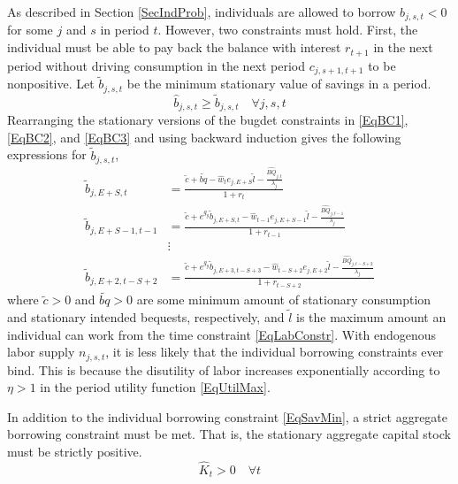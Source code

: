 \documentclass[letterpaper,12pt]{article}
\theoremstyle{definition}
\begin{document}
  As described in Section \ref{SecIndProb}, individuals are allowed to borrow $b_{j,s,t}<0$ for some $j$ and $s$ in period $t$. However, two constraints must hold. First, the individual must be able to pay back the balance with interest $r_{t+1}$ in the next period without driving consumption in the next period $c_{j,s+1,t+1}$ to be nonpositive. Let $\tilde{b}_{j,s,t}$ be the minimum stationary value of savings in a period.
  \begin{equation}\label{EqSavMin}
    \hat{b}_{j,s,t}\geq\tilde{b}_{j,s,t} \quad\forall j,s,t
  \end{equation}
  Rearranging the stationary versions of the bugdet constraints in \eqref{EqBC1}, \eqref{EqBC2}, and \eqref{EqBC3} and using backward induction gives the following expressions for $\tilde{b}_{j,s,t}$,
  \begin{equation}\label{EqBorConsts}
    \begin{split}
      \tilde{b}_{j,E+S,t} &= \frac{\tilde{c} + \tilde{bq} - \hat{w}_t e_{j,E+S}\tilde{l} - \frac{\hat{BQ}_{j,t}}{\lambda_j}}{1+r_t}  \\
      \tilde{b}_{j,E+S-1,t-1} &= \frac{\tilde{c} + e^{g_y}\tilde{b}_{j,E+S,t} - \hat{w}_{t-1}e_{j,E+S-1}\tilde{l} - \frac{\hat{BQ}_{j,t-1}}{\lambda_j}}{1+r_{t-1}} \\
      &\vdots \\
      \tilde{b}_{j,E+2,t-S+2} &= \frac{\tilde{c} + e^{g_y}\tilde{b}_{j,E+3,t-S+3} - \hat{w}_{t-S+2}e_{j,E+2}\tilde{l} - \frac{\hat{BQ}_{j,t-S+2}}{\lambda_j}}{1+r_{t-S+2}}
    \end{split}
  \end{equation}
  where $\tilde{c}>0$ and $\tilde{bq}>0$ are some minimum amount of stationary consumption and stationary intended bequests, respectively, and $\tilde{l}$ is the maximum amount an individual can work from the time constraint \eqref{EqLabConstr}. With endogenous labor supply $n_{j,s,t}$, it is less likely that the individual borrowing constraints ever bind. This is because the disutility of labor increases exponentially according to $\eta>1$ in the period utility function \eqref{EqUtilMax}.

  In addition to the individual borrowing constraint \eqref{EqSavMin}, a strict aggregate borrowing constraint must be met. That is, the stationary aggregate capital stock must be strictly positive.
  \begin{equation}\label{EqAggrCapConstr}
    \hat{K}_t > 0 \quad\forall t
  \end{equation}
\end{document}
